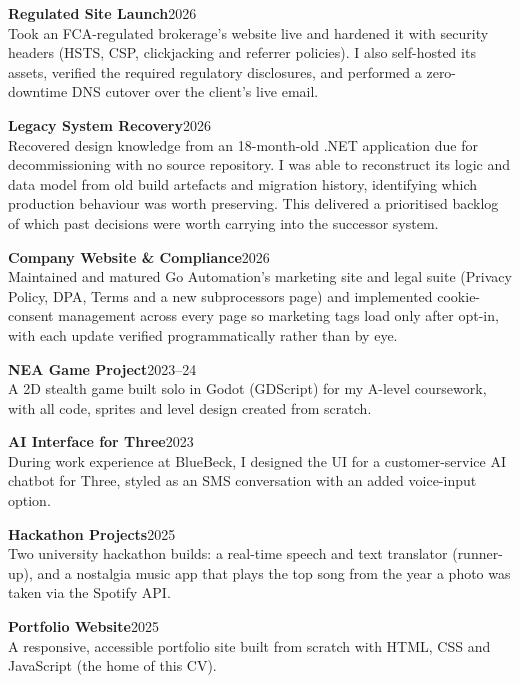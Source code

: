 \documentclass[11pt,a4paper]{article}
\newcommand{\project}[2]{\noindent\textbf{#1}\hfill #2}
\begin{document}
\vspace{6pt}
\project{Regulated Site Launch}{2026}\\
Took an FCA-regulated brokerage's website live and hardened it with security headers (HSTS, CSP, clickjacking and referrer policies). I also self-hosted its assets, verified the required regulatory disclosures, and performed a zero-downtime DNS cutover over the client's live email.

\vspace{6pt}
\project{Legacy System Recovery}{2026}\\
Recovered design knowledge from an 18-month-old .NET application due for decommissioning with no source repository. I was able to reconstruct its logic and data model from old build artefacts and migration history, identifying which production behaviour was worth preserving. This delivered a prioritised backlog of which past decisions were worth carrying into the successor system.

\vspace{6pt}
\project{Company Website \& Compliance}{2026}\\
Maintained and matured Go Automation's marketing site and legal suite (Privacy Policy, DPA, Terms and a new subprocessors page) and implemented cookie-consent management across every page so marketing tags load only after opt-in, with each update verified programmatically rather than by eye.

\vspace{6pt}
\project{NEA Game Project}{2023--24}\\
A 2D stealth game built solo in Godot (GDScript) for my A-level coursework, with all code, sprites and level design created from scratch.

\vspace{6pt}
\project{AI Interface for Three}{2023}\\
During work experience at BlueBeck, I designed the UI for a customer-service AI chatbot for Three, styled as an SMS conversation with an added voice-input option.

\vspace{6pt}
\project{Hackathon Projects}{2025}\\
Two university hackathon builds: a real-time speech and text translator (runner-up), and a nostalgia music app that plays the top song from the year a photo was taken via the Spotify API.

\vspace{6pt}
\project{Portfolio Website}{2025}\\
A responsive, accessible portfolio site built from scratch with HTML, CSS and JavaScript (the home of this CV).
\end{document}
